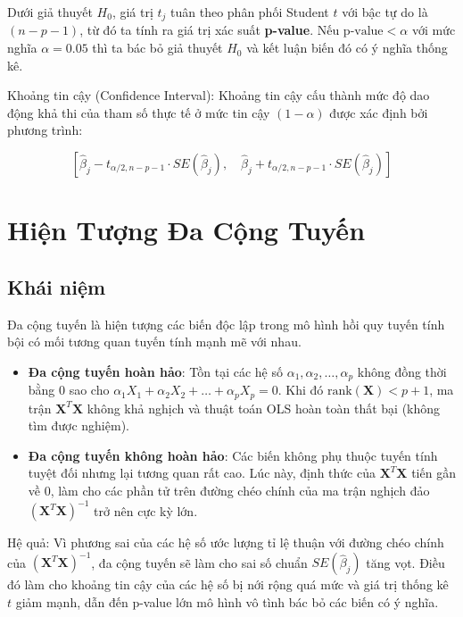 Dưới giả thuyết $H_0$, giá trị $t_j$ tuân theo phân phối Student $t$ với bậc tự do là $(n - p - 1)$, từ đó ta tính ra giá trị xác suất \textbf{p-value}. Nếu $\text{p-value} < \alpha$ với mức nghĩa $\alpha = 0.05$ thì ta bác bỏ giả thuyết $H_0$ và kết luận biến đó có ý nghĩa thống kê.

Khoảng tin cậy (Confidence Interval): Khoảng tin cậy cấu thành mức độ dao động khả thi của tham số thực tế ở mức tin cậy $(1 - \alpha)$ được xác định bởi phương trình:

$$\left[ \hat{\beta}_j - t_{\alpha/2, n-p-1} \cdot SE(\hat{\beta}_j), \quad \hat{\beta}_j + t_{\alpha/2, n-p-1} \cdot SE(\hat{\beta}_j) \right]$$

\section{Hiện Tượng Đa Cộng Tuyến}

\subsection{Khái niệm}

Đa cộng tuyến là hiện tượng các biến độc lập trong mô hình hồi quy tuyến tính bội có mối tương quan tuyến tính mạnh mẽ với nhau.

\begin{itemize}[topsep=0pt, itemsep=2.5pt, leftmargin=1.5cm]
    \item \textbf{Đa cộng tuyến hoàn hảo}: Tồn tại các hệ số $\alpha_1, \alpha_2, \dots, \alpha_p$ không đồng thời bằng 0 sao cho $\alpha_1 X_1 + \alpha_2 X_2 + \dots + \alpha_p X_p = 0$. Khi đó $\text{rank}(\mathbf{X}) < p+1$, ma trận $\mathbf{X}^T\mathbf{X}$ không khả nghịch và thuật toán OLS hoàn toàn thất bại (không tìm được nghiệm).
    \item \textbf{Đa cộng tuyến không hoàn hảo}: Các biến không phụ thuộc tuyến tính tuyệt đối nhưng lại tương quan rất cao. Lúc này, định thức của $\mathbf{X}^T\mathbf{X}$ tiến gần về 0, làm cho các phần tử trên đường chéo chính của ma trận nghịch đảo $(\mathbf{X}^T\mathbf{X})^{-1}$ trở nên cực kỳ lớn.
\end{itemize}

Hệ quả: Vì phương sai của các hệ số ước lượng tỉ lệ thuận với đường chéo chính của $(\mathbf{X}^T\mathbf{X})^{-1}$, đa cộng tuyến sẽ làm cho sai số chuẩn $SE(\hat{\beta}_j)$ tăng vọt. Điều đó làm cho khoảng tin cậy của các hệ số bị nới rộng quá mức và giá trị thống kê $t$ giảm mạnh, dẫn đến p-value lớn mô hình vô tình bác bỏ các biến có ý nghĩa.

